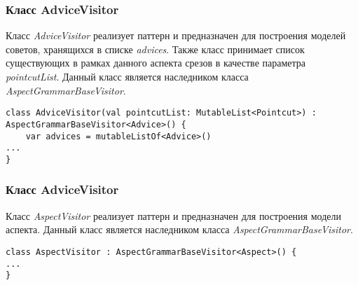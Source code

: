 \subsubsection{Класс AdviceVisitor}
\label{ssub:AdviceVisitor}
Класс \textit{AdviceVisitor} реализует паттерн  и
предназначен для построения моделей советов, хранящихся в списке
\textit{advices}.
Также класс принимает список существующих в рамках данного аспекта срезов в качестве параметра \textit{pointcutList}.
Данный класс является наследником класса \textit{AspectGrammarBaseVisitor}.

\begin{lstlisting}[style={java}, label={lst:AdviceVisitor},
  caption={Класс AdviceVisitor}]
class AdviceVisitor(val pointcutList: MutableList<Pointcut>) : AspectGrammarBaseVisitor<Advice>() {
    var advices = mutableListOf<Advice>()
...
}
\end{lstlisting}
\subsubsection{Класс AdviceVisitor}
\label{ssub:AdviceVisitor}
Класс \textit{AspectVisitor} реализует паттерн  и
предназначен для построения модели аспекта.
Данный класс является наследником класса \textit{AspectGrammarBaseVisitor}.

\begin{lstlisting}[style={java}, label={lst:AspectVisitor},
  caption={Класс AspectVisitor}]
class AspectVisitor : AspectGrammarBaseVisitor<Aspect>() {
...
}
\end{lstlisting}

